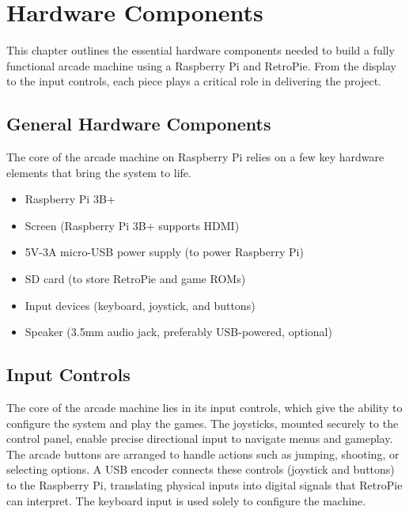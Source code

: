 \chapter{Hardware Components}
\label{cha:hardware_components}

This chapter outlines the essential hardware components needed to build a fully functional arcade machine using a Raspberry Pi and RetroPie. From the display to the input controls, each piece plays a critical role in delivering the project.

\section{General Hardware Components}
\label{sec:general_hardware_components}

The core of the arcade machine on Raspberry Pi relies on a few key hardware elements that bring the system to life. 

\begin{itemize}
    \item Raspberry Pi 3B+ 
    \item Screen (Raspberry Pi 3B+ supports HDMI)
    \item 5V-3A micro-USB power supply (to power Raspberry Pi)
    \item SD card (to store RetroPie and game ROMs)
    \item Input devices (keyboard, joystick, and buttons)    
    \item Speaker (3.5mm audio jack, preferably USB-powered, optional)
\end{itemize}

\section{Input Controls}
\label{sec:input_controls}

The core of the arcade machine lies in its input controls, which give the ability to configure the system and play the games. The joysticks, mounted securely to the control panel, enable precise directional input to navigate menus and gameplay. The arcade buttons are arranged to handle actions such as jumping, shooting, or selecting options. A USB encoder connects these controls (joystick and buttons) to the Raspberry Pi, translating physical inputs into digital signals that RetroPie can interpret. The keyboard input is used solely to configure the machine. 


